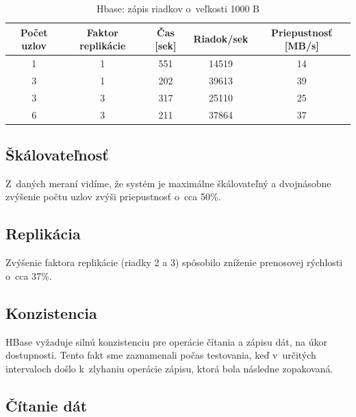 \documentclass[11pt,twoside,a4paper]{book}
\begin{document}

 

\begin{table}[hp]
\begin{center}
\begin{tabular}{|c|c|c|c|c|}
\hline Počet uzlov & Faktor replikácie  & Čas [sek] & Riadok/sek & Priepustnosť [MB/s]\\ 
\hline
\hline 1 & 1 &  551 & 14519 & 14\\ 
\hline 3 & 1 &  202 & 39613 & 39\\ 
\hline 3 & 3 &  317 & 25110 & 25\\ 
\hline 6 & 3 &  211 & 37864 & 37\\ 
\hline
\end{tabular} 
\end{center}
\caption{Hbase: zápis riadkov o~veľkosti 1000 B}
\label{tab:HPerf1}
\end{table}

\subsection*{Škálovateľnosť}

Z~daných meraní vidíme, že systém je maximálne škálovateľný a dvojnásobne zvýšenie počtu uzlov zvýši priepustnosť o~cca 50\%.

\subsection*{Replikácia}

Zvýšenie faktora replikácie (riadky 2 a 3) spôsobilo zníženie prenosovej rýchlosti o~cca 37\%.

\subsection*{Konzistencia}

HBase vyžaduje silnú konzistenciu pre operácie čítania a zápisu dát, na úkor dostupnosti. Tento fakt sme zaznamenali počas testovania, keď v~určitých intervaloch došlo k~zlyhaniu operácie zápisu, ktorá bola následne zopakovaná.

\subsection*{Čítanie dát}
\end{document}
